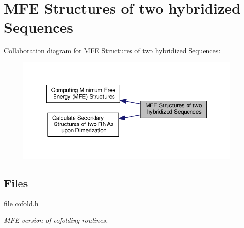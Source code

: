 \hypertarget{group__mfe__cofold}{\section{M\-F\-E Structures of two hybridized Sequences}
\label{group__mfe__cofold}
}
Collaboration diagram for M\-F\-E Structures of two hybridized Sequences\-:
\nopagebreak
\begin{figure}[H]
\begin{center}
\leavevmode
\includegraphics[width=350pt]{group__mfe__cofold}
\end{center}
\end{figure}
\subsection*{Files}
\begin{DoxyCompactItemize}
\item 
file \hyperlink{cofold_8h}{cofold.\-h}
\begin{DoxyCompactList}\small\item\em M\-F\-E version of cofolding routines. \end{DoxyCompactList}\end{DoxyCompactItemize}
